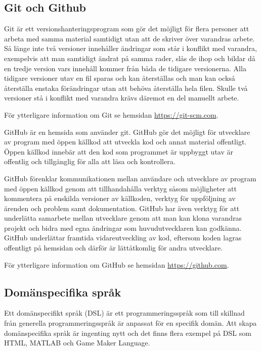 \documentclass[]{article}
\begin{document}
\subsection{Git och Github}
Git är ett versionshanteringsprogram som gör det möjligt för flera personer att
arbeta med samma material samtidigt utan att de skriver över varandras arbete.
Så länge inte två versioner innehåller ändringar som står i konflikt med
varandra, exempelvis att man samtidigt ändrat på samma rader, slås de ihop och
bildar då en tredje version vars innehåll kommer från båda de tidigare
versionerna. Alla tidigare versioner utav en fil sparas och kan återställas och
man kan också återställa enstaka förändringar utan att behöva återställa hela
filen. Skulle två versioner stå i konflikt med varandra krävs däremot en del
manuellt arbete.

För ytterligare information om Git se hemsidan \url{https://git-scm.com}.

GitHub är en hemsida som använder git. GitHub gör det möjligt för utvecklare av
program med öppen källkod att utveckla kod och annat material offentligt.
Öppen källkod innebär att den kod som programmet är uppbyggt utav är offentlig
och tillgänglig för alla att läsa och kontrollera.

GitHub förenklar kommunikationen mellan användare och utvecklare av program med
öppen källkod genom att tillhandahålla verktyg såsom möjligheter att kommentera
på enskilda versioner av källkoden, verktyg för uppföljning av ärenden och
problem samt dokumentation. GitHub har även verktyg för att underlätta samarbete
mellan utvecklare genom att man kan klona varandras projekt och bidra med egna
ändringar som huvudutvecklaren kan godkänna. GitHub underlättar framtida
vidareutveckling av kod, eftersom koden lagras offentligt på hemsidan och
därför är lättåtkomlig för andra utvecklare.

För ytterligare information om GitHub se hemsidan \url{https://github.com}.

\subsection{Domänspecifika språk}
Ett domänspecifikt språk (\gls{DSL}) är ett programmeringsspråk som till
skillnad från generella programmeringsspråk är anpassat för en
specifik domän. Att skapa domänspecifika språk är ingenting nytt och det
finns flera exempel på DSL som HTML, MATLAB och Game Maker Language.
\end{document}

